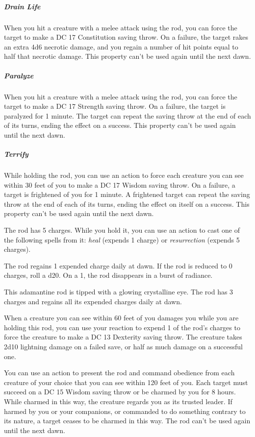 \documentclass[10pt,a4paper,twoside,bg=print,twocolumn,openany,nodeprecatedcode]{dndbook}
\begin{document}
\subparagraph{Drain Life}
When you hit a creature with a melee attack using the rod, you can force the target to make a DC 17 Constitution saving throw. On a failure, the target rakes an extra 4d6 necrotic damage, and you regain a number of hit points equal to half that necrotic damage. This property can't be used again until the next dawn.

\subparagraph{Paralyze}
When you hit a creature with a melee attack using the rod, you can force the target to make a DC 17 Strength saving throw. On a failure, the target is paralyzed for 1 minute. The target can repeat the saving throw at the end of each of its turns, ending the effect on a success. This property can't be used again until the next dawn.

\subparagraph{Terrify}
While holding the rod, you can use an action to force each creature you can see within 30 feet of you to make a DC 17 Wisdom saving throw. On a failure, a target is frightened of you for 1 minute. A frightened target can repeat the saving throw at the end of each of its turns, ending the effect on itself on a success. This property can't be used again until the next dawn.

The rod has 5 charges. While you hold it, you can use an action to cast one of the following spells from it: \textit{heal} (expends 1 charge) or \textit{resurrection} (expends 5 charges).

The rod regains 1 expended charge daily at dawn. If the rod is reduced to 0 charges, roll a d20. On a 1, the rod disappears in a burst of radiance.

This adamantine rod is tipped with a glowing crystalline eye. The rod has 3 charges and regains all its expended charges daily at dawn.

When a creature you can see within 60 feet of you damages you while you are holding this rod, you can use your reaction to expend 1 of the rod's charges to force the creature to make a DC 13 Dexterity saving throw. The creature takes 2d10 lightning damage on a failed save, or half as much damage on a successful one.

You can use an action to present the rod and command obedience from each creature of your choice that you can see within 120 feet of you. Each target must succeed on a DC 15 Wisdom saving throw or be charmed by you for 8 hours. While charmed in this way, the creature regards you as its trusted leader. If harmed by you or your companions, or commanded to do something contrary to its nature, a target ceases to be charmed in this way. The rod can't be used again until the next dawn.
\end{document}
